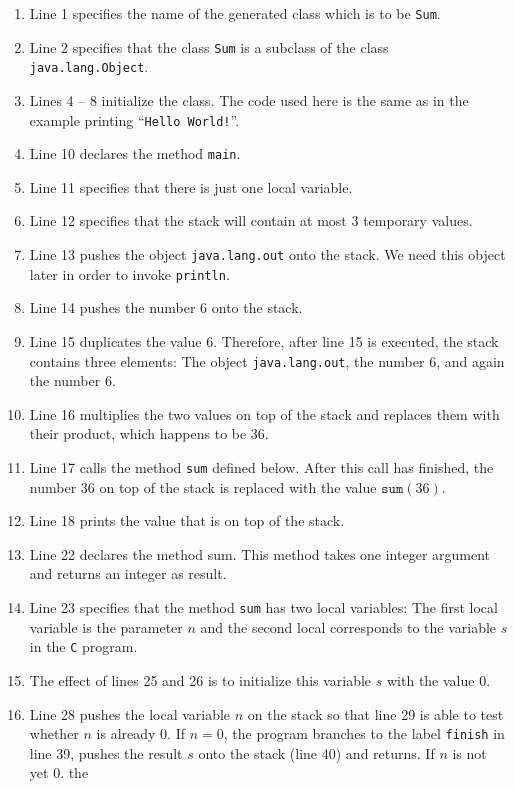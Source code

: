 \begin{enumerate}
\item Line 1 specifies the name of the generated class which is to be \texttt{Sum}.
\item Line 2 specifies that the class \texttt{Sum} is a subclass of the class
      \texttt{java.lang.Object}. 
\item Lines 4 -- 8 initialize the class.  The code used here is the same as in the example printing 
      ``\texttt{Hello World!}''.
\item Line 10 declares the method \texttt{main}.
\item Line 11 specifies that there is just one local variable.
\item Line 12 specifies that the stack will contain at most 3 temporary values.
\item Line 13 pushes the object \texttt{java.lang.out} onto the stack.
      We need this object later in order to invoke \texttt{println}.
\item Line 14 pushes the number 6 onto the stack.
\item Line 15 duplicates the value 6.  Therefore, after line 15 is executed, the stack contains three
      elements: The object \texttt{java.lang.out},  the number 6, and again the number 6.
\item Line 16 multiplies the two values on top of the stack and replaces them with their product,
      which happens to be 36.
\item Line 17 calls the method \texttt{sum} defined below.  After this call has finished, the number 
      36 on top of the stack is replaced with the value $\mathtt{sum}(36)$.
\item Line 18 prints the value that is on top of the stack. 
\item Line 22 declares the method sum.  This method takes one integer argument and returns an
      integer as result. 
\item Line 23 specifies that the method \texttt{sum} has two local variables: The first local
      variable is the parameter $n$ and the second local corresponds to the variable $s$ in the
      \texttt{C} program.
\item The effect of lines 25 and 26 is to initialize this variable $s$ with the value $0$.
\item Line 28 pushes the local variable $n$ on the stack so that line 29 is able to test whether $n$
      is already $0$.  If $n = 0$, the program branches to the label \texttt{finish} in line 39,
      pushes the result $s$ onto the stack (line 40) and returns.  If $n$ is not yet $0$. the

\end{enumerate}
